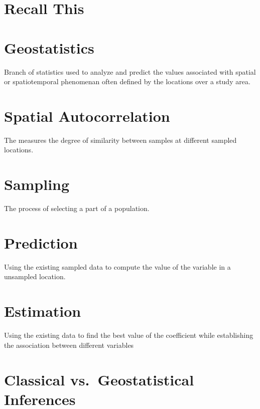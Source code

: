 \documentclass[
]{book}
\begin{document}
\hypertarget{recall-this}{%
\section*{Recall This}\label{recall-this}}

\hypertarget{geostatistics}{%
\section{Geostatistics}\label{geostatistics}}

Branch of statistics used to analyze and predict the values associated with spatial or spatiotemporal phenomenan often defined by the locations over a study area.

\hypertarget{spatial-autocorrelation}{%
\section{Spatial Autocorrelation}\label{spatial-autocorrelation}}

The measures the degree of similarity between samples at different sampled locations.

\hypertarget{sampling}{%
\section{Sampling}\label{sampling}}

The process of selecting a part of a population.

\hypertarget{prediction}{%
\section{Prediction}\label{prediction}}

Using the existing sampled data to compute the value of the variable in a unsampled location.

\hypertarget{estimation}{%
\section{Estimation}\label{estimation}}

Using the existing data to find the best value of the coefficient while establishing the association between different variables

\hypertarget{classical-vs.-geostatistical-inferences}{%
\section{Classical vs.~Geostatistical Inferences}\label{classical-vs.-geostatistical-inferences}}
\end{document}
